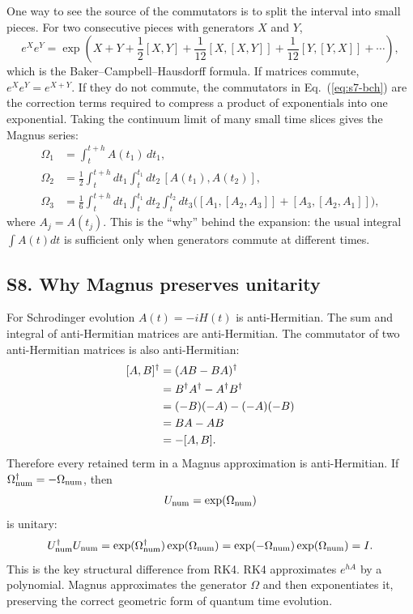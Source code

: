 \documentclass[aps,pra,preprint,superscriptaddress,nofootinbib]{revtex4-2}
\begin{document}
One way to see the source of the commutators is to split the interval into small pieces. For two consecutive pieces with generators \(X\) and \(Y\),
\begin{equation}
e^X e^Y
=\exp\left(X+Y+\frac{1}{2}[X,Y]
+\frac{1}{12}[X,[X,Y]]
+\frac{1}{12}[Y,[Y,X]]+\cdots\right),
\label{eq:s7-bch}
\end{equation}
which is the Baker--Campbell--Hausdorff formula. If matrices commute, \(e^Xe^Y=e^{X+Y}\). If they do not commute, the commutators in Eq.~(\ref{eq:s7-bch}) are the correction terms required to compress a product of exponentials into one exponential. Taking the continuum limit of many small time slices gives the Magnus series:
\begin{align}
\Omega_1&=\int_t^{t+h} A(t_1)\,dt_1,\\
\Omega_2&=\frac{1}{2}\int_t^{t+h}dt_1
\int_t^{t_1}dt_2\,[A(t_1),A(t_2)],\\
\Omega_3&=\frac{1}{6}\int_t^{t+h}dt_1
\int_t^{t_1}dt_2
\int_t^{t_2}dt_3
\Big([A_1,[A_2,A_3]]+[A_3,[A_2,A_1]]\Big),
\end{align}
where \(A_j=A(t_j)\). This is the ``why'' behind the expansion: the usual integral \(\int A(t)dt\) is sufficient only when generators commute at different times.

\subsection*{S8. Why Magnus preserves unitarity}

For Schrodinger evolution \(A(t)=-iH(t)\) is anti-Hermitian. The sum and integral of anti-Hermitian matrices are anti-Hermitian. The commutator of two anti-Hermitian matrices is also anti-Hermitian:
\begin{equation}
\begin{aligned}
\relax
[A,B]^\dagger
&=(AB-BA)^\dagger\\
&=B^\dagger A^\dagger-A^\dagger B^\dagger\\
&=(-B)(-A)-(-A)(-B)\\
&=BA-AB\\
&=-[A,B].
\end{aligned}
\end{equation}
Therefore every retained term in a Magnus approximation is anti-Hermitian. If \(\Omega_{\rm num}^\dagger=-\Omega_{\rm num}\), then
\begin{equation}
U_{\rm num}=\exp(\Omega_{\rm num})
\end{equation}
is unitary:
\begin{equation}
U_{\rm num}^\dagger U_{\rm num}
=\exp(\Omega_{\rm num}^\dagger)\exp(\Omega_{\rm num})
=\exp(-\Omega_{\rm num})\exp(\Omega_{\rm num})=I.
\end{equation}
This is the key structural difference from RK4. RK4 approximates \(e^{hA}\) by a polynomial. Magnus approximates the generator \(\Omega\) and then exponentiates it, preserving the correct geometric form of quantum time evolution.
\end{document}
